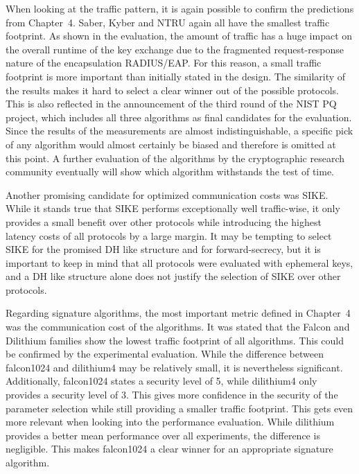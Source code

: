 When looking at the traffic pattern, it is again possible to confirm the predictions from Chapter~4. Saber, Kyber and NTRU again all have the smallest traffic footprint. As shown in the evaluation, the amount of traffic has a huge impact on the overall runtime of the key exchange due to the fragmented request-response nature of the encapsulation RADIUS/EAP. For this reason, a small traffic footprint is more important than initially stated in the design. The similarity of the results makes it hard to select a clear winner out of the possible protocols. This is also reflected in the announcement of the third round of the \ac{NIST} \ac{PQ} project, which includes all three algorithms as final candidates for the evaluation. Since the results of the measurements are almost indistinguishable, a specific pick of any algorithm would almost certainly be biased and therefore is omitted at this point. A further evaluation of the algorithms by the cryptographic research community eventually will show which algorithm withstands the test of time.

Another promising candidate for optimized communication costs was SIKE. While it stands true that SIKE performs exceptionally well traffic-wise, it only provides a small benefit over other protocols while introducing the highest latency costs of all protocols by a large margin. It may be tempting to select SIKE for the promised DH like structure and for forward-secrecy, but it is important to keep in mind that all protocols were evaluated with ephemeral keys, and a DH like structure alone does not justify the selection of SIKE over other protocols.

Regarding signature algorithms, the most important metric defined in Chapter~4 was the communication cost of the algorithms. It was stated that the Falcon and Dilithium families show the lowest traffic footprint of all algorithms. This could be confirmed by the experimental evaluation. While the difference between falcon1024 and dilithium4 may be relatively small, it is nevertheless significant. Additionally, falcon1024 states a security level of 5, while dilithium4 only provides a security level of 3. This gives more confidence in the security of the parameter selection while still providing a smaller traffic footprint. This gets even more relevant when looking into the performance evaluation. While dilithium provides a better mean performance over all experiments, the difference is negligible. This makes falcon1024 a clear winner for an appropriate signature algorithm.

